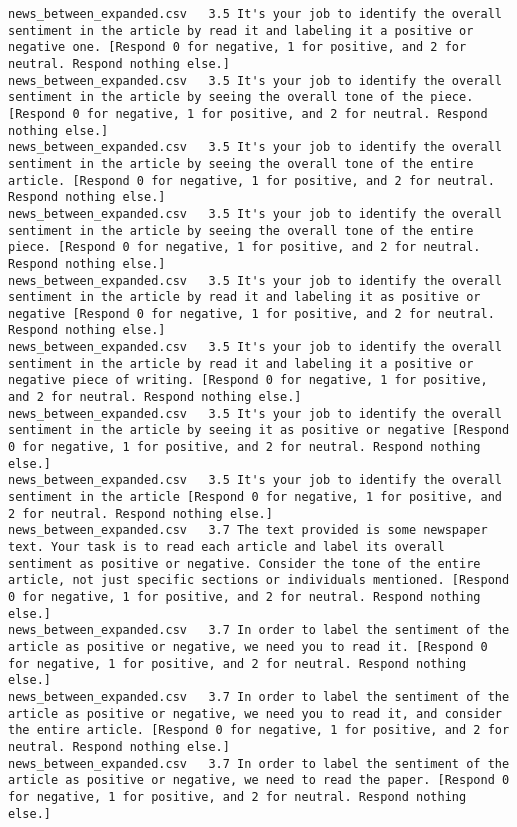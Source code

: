 \begin{lstlisting}[label=lst:promptvariants]
news_between_expanded.csv	3.5	It's your job to identify the overall sentiment in the article by read it and labeling it a positive or negative one. [Respond 0 for negative, 1 for positive, and 2 for neutral. Respond nothing else.]
news_between_expanded.csv	3.5	It's your job to identify the overall sentiment in the article by seeing the overall tone of the piece. [Respond 0 for negative, 1 for positive, and 2 for neutral. Respond nothing else.]
news_between_expanded.csv	3.5	It's your job to identify the overall sentiment in the article by seeing the overall tone of the entire article. [Respond 0 for negative, 1 for positive, and 2 for neutral. Respond nothing else.]
news_between_expanded.csv	3.5	It's your job to identify the overall sentiment in the article by seeing the overall tone of the entire piece. [Respond 0 for negative, 1 for positive, and 2 for neutral. Respond nothing else.]
news_between_expanded.csv	3.5	It's your job to identify the overall sentiment in the article by read it and labeling it as positive or negative [Respond 0 for negative, 1 for positive, and 2 for neutral. Respond nothing else.]
news_between_expanded.csv	3.5	It's your job to identify the overall sentiment in the article by read it and labeling it a positive or negative piece of writing. [Respond 0 for negative, 1 for positive, and 2 for neutral. Respond nothing else.]
news_between_expanded.csv	3.5	It's your job to identify the overall sentiment in the article by seeing it as positive or negative [Respond 0 for negative, 1 for positive, and 2 for neutral. Respond nothing else.]
news_between_expanded.csv	3.5	It's your job to identify the overall sentiment in the article [Respond 0 for negative, 1 for positive, and 2 for neutral. Respond nothing else.]
news_between_expanded.csv	3.7	The text provided is some newspaper text. Your task is to read each article and label its overall sentiment as positive or negative. Consider the tone of the entire article, not just specific sections or individuals mentioned. [Respond 0 for negative, 1 for positive, and 2 for neutral. Respond nothing else.]
news_between_expanded.csv	3.7	In order to label the sentiment of the article as positive or negative, we need you to read it. [Respond 0 for negative, 1 for positive, and 2 for neutral. Respond nothing else.]
news_between_expanded.csv	3.7	In order to label the sentiment of the article as positive or negative, we need you to read it, and consider the entire article. [Respond 0 for negative, 1 for positive, and 2 for neutral. Respond nothing else.]
news_between_expanded.csv	3.7	In order to label the sentiment of the article as positive or negative, we need to read the paper. [Respond 0 for negative, 1 for positive, and 2 for neutral. Respond nothing else.]

\end{lstlisting}

